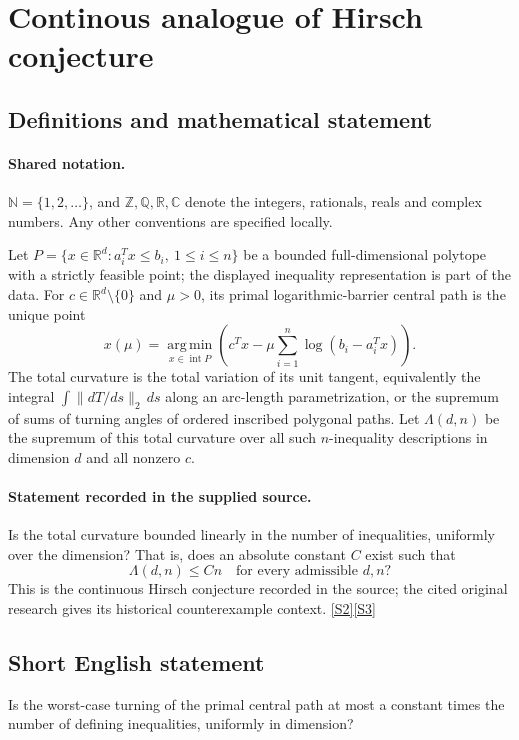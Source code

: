 \documentclass[11pt]{book}
\newcommand{\sref}[2]{\hyperlink{source:#1:#2}{[S#2]}}
\begin{document}
\section{Continous analogue of Hirsch conjecture}\label{statement}

\subsection{Definitions and mathematical statement}

\paragraph{Shared notation.}$\mathbb N=\{1,2,\ldots\}$, and $\mathbb Z,\mathbb Q,\mathbb R,\mathbb C$ denote the integers, rationals, reals and complex numbers. Any other conventions are specified locally.


Let $P=\{x\in\mathbb R^d:a_i^Tx\leq b_i,\ 1\leq i\leq n\}$ be a bounded full-dimensional polytope with a strictly feasible point; the displayed inequality representation is part of the data. For $c\in\mathbb R^d\setminus\{0\}$ and $\mu>0$, its primal logarithmic-barrier central path is the unique point
\[x(\mu)=\operatorname*{arg\,min}_{x\in\operatorname{int}P}\left(c^Tx-\mu\sum_{i=1}^n\log(b_i-a_i^Tx)\right).\]
The total curvature is the total variation of its unit tangent, equivalently the integral $\int\|dT/ds\|_2\,ds$ along an arc-length parametrization, or the supremum of sums of turning angles of ordered inscribed polygonal paths. Let $\Lambda(d,n)$ be the supremum of this total curvature over all such $n$-inequality descriptions in dimension $d$ and all nonzero $c$.
\paragraph{Statement recorded in the supplied source.}
Is the total curvature bounded linearly in the number of inequalities, uniformly over the dimension? That is, does an absolute constant $C$ exist such that
\[\Lambda(d,n)\leq Cn\quad\text{for every admissible }d,n?\]
This is the continuous Hirsch conjecture recorded in the source; the cited original research gives its historical counterexample context. \sref{statement}{2}\sref{statement}{3}
\subsection{Short English statement}
Is the worst-case turning of the primal central path at most a constant times the number of defining inequalities, uniformly in dimension?
\end{document}
